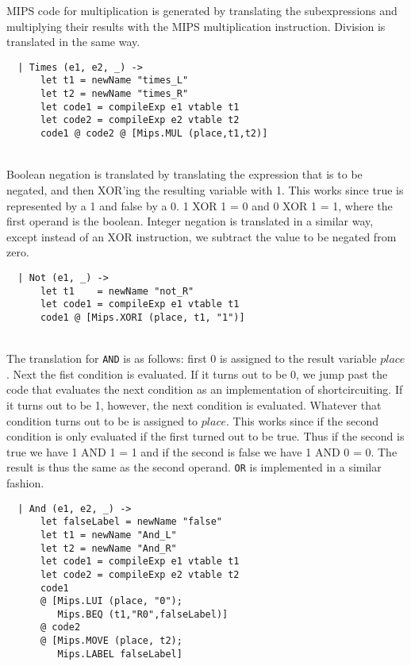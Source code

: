 MIPS code for multiplication is generated by translating the subexpressions and multiplying their results with the MIPS multiplication instruction. Division is translated in the same way.
\begin{verbatim}
  | Times (e1, e2, _) ->
      let t1 = newName "times_L"
      let t2 = newName "times_R"
      let code1 = compileExp e1 vtable t1
      let code2 = compileExp e2 vtable t2
      code1 @ code2 @ [Mips.MUL (place,t1,t2)]
\end{verbatim}
~\\

Boolean negation is translated by translating the expression that is to be negated, and then XOR'ing the resulting variable with 1. This works since true is represented by a 1 and false by a 0. 1 XOR 1 = 0 and 0 XOR 1 = 1, where the first operand is the boolean. Integer negation is translated in a similar way, except instead of an XOR instruction, we subtract the value to be negated from zero.
\begin{verbatim}
  | Not (e1, _) ->
      let t1    = newName "not_R"
      let code1 = compileExp e1 vtable t1
      code1 @ [Mips.XORI (place, t1, "1")]
\end{verbatim}
~\\

The translation for \texttt{AND} is as follows: first 0 is assigned to the result variable $place$. Next the fist condition is evaluated. If it turns out to be 0, we jump past the code that evaluates the next condition as an implementation of shortcircuiting. If it turns out to be 1, however, the next condition is evaluated. Whatever that condition turns out to be is assigned to $place$. This works since if the second condition is only evaluated if the first turned out to be true. Thus if the second is true we have 1 AND 1 = 1 and if the second is false we have 1 AND 0 = 0. The result is thus the same as the second operand. \texttt{OR} is implemented in a similar fashion.
\begin{verbatim}
  | And (e1, e2, _) ->
      let falseLabel = newName "false"
      let t1 = newName "And_L"
      let t2 = newName "And_R"
      let code1 = compileExp e1 vtable t1
      let code2 = compileExp e2 vtable t2
      code1 
      @ [Mips.LUI (place, "0");
         Mips.BEQ (t1,"R0",falseLabel)]
      @ code2
      @ [Mips.MOVE (place, t2);
         Mips.LABEL falseLabel]
\end{verbatim}
~\\


